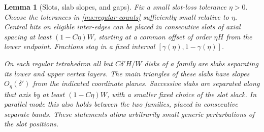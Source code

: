 \documentclass[11pt]{article}
\numberwithin{equation}{section}
\newtheorem{lemma}[theorem]{Lemma}
\theoremstyle{definition}
\theoremstyle{remark}
\begin{document}
\begin{lemma}[Slots, slab slopes, and gaps]
\label{ms:slots}
Fix a small slot-loss tolerance $\eta>0$.  Choose the tolerances in
\eqref{ms:regular-counts} sufficiently small relative to $\eta$.
Central hits on eligible inter-edges can be placed in consecutive
slots of axial spacing at least $(1-C\eta)W$, starting at a common
offset of order $\eta H$ from the lower endpoint.  Fractions stay
in a fixed interval $[\gamma(\eta),1-\gamma(\eta)]$.

On each regular tetrahedron all but $C\delta'H/W$ disks of a family
are slabs separating its lower and upper vertex layers.  The main
triangles of these slabs have slopes $O_\eta(\delta')$ from the
indicated coordinate planes.  Successive slabs are separated along
that axis by at least $(1-C\eta)W$, with a smaller fixed choice of
the slot slack.  In parallel mode this also holds between the two
families, placed in consecutive separate bands.  These statements
allow arbitrarily small generic perturbations of the slot positions.
\end{lemma}
\end{document}
